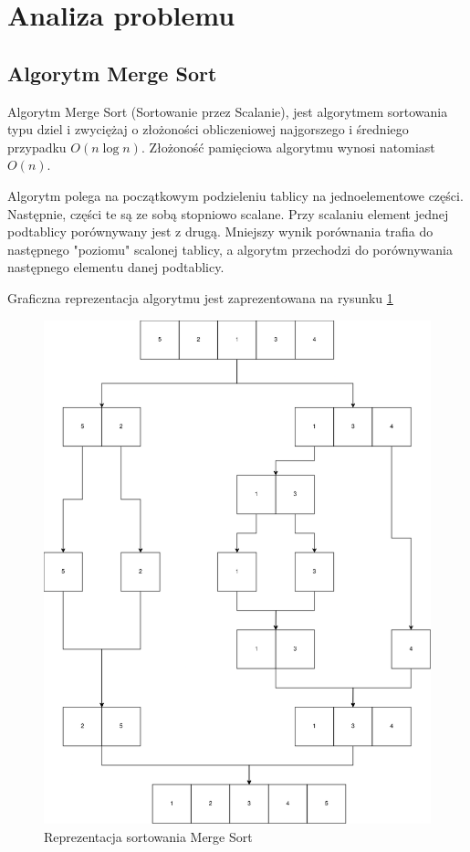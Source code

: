 \newpage
\section{Analiza problemu}		%

\subsection{Algorytm Merge Sort}

Algorytm Merge Sort\cite{mergewiki} (Sortowanie przez Scalanie), jest algorytmem sortowania typu dziel i zwyciężaj\cite{divideandconquerwiki} o złożoności obliczeniowej najgorszego i średniego przypadku $ O(n \log{n}) $. Złożoność pamięciowa algorytmu wynosi natomiast $ O(n) $.

Algorytm polega na początkowym podzieleniu tablicy na jednoelementowe części. Następnie, części te są ze sobą stopniowo scalane. Przy scalaniu element jednej podtablicy porównywany jest z drugą. Mniejszy wynik porównania trafia do następnego "poziomu" scalonej tablicy, a algorytm przechodzi do porównywania następnego elementu danej podtablicy.

Graficzna reprezentacja algorytmu jest zaprezentowana na rysunku \ref{fig:mergesort}

\begin{figure}[H]
	\centering
	\includegraphics[width=0.7\linewidth]{images/mergesort.drawio.png}
	\caption{Reprezentacja sortowania Merge Sort}
	\label{fig:mergesort}
\end{figure}

